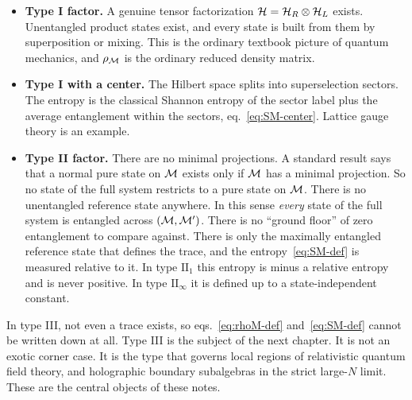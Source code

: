\begin{itemize}
\item \textbf{Type I factor.} A genuine tensor factorization $\mathcal{H}=\mathcal{H}_R\otimes\mathcal{H}_L$ exists. Unentangled
product states exist, and every state is built from them by superposition or mixing. This is the ordinary
textbook picture of quantum mechanics, and $\rho_{\mathcal{M}}$ is the ordinary reduced density matrix.
\item \textbf{Type I with a center.} The Hilbert space splits into superselection sectors. The entropy is the
classical Shannon entropy of the sector label plus the average entanglement within the sectors,
eq.~\eqref{eq:SM-center}. Lattice gauge theory is an example.
\item \textbf{Type II factor.} There are no minimal projections. A standard result says that a normal pure state
on $\mathcal{M}$ exists only if $\mathcal{M}$ has a minimal projection. So no state of the full system restricts to a pure state
on $\mathcal{M}$. There is no unentangled reference state anywhere. In this sense \emph{every} state of the full system
is entangled across $(\mathcal{M},\mathcal{M}')$. There is no ``ground floor'' of zero entanglement to compare against. There is
only the maximally entangled reference state that defines the trace, and the entropy~\eqref{eq:SM-def} is
measured relative to it. In type $\mathrm{II}_1$ this entropy is minus a relative entropy and is never positive.
In type $\mathrm{II}_\infty$ it is defined up to a state-independent constant.
\end{itemize}

In type III, not even a trace exists, so eqs.~\eqref{eq:rhoM-def} and~\eqref{eq:SM-def} cannot be written down
at all. Type III is the subject of the next chapter. It is not an exotic corner case. It is the type that governs
local regions of relativistic quantum field theory, and holographic boundary subalgebras in the strict large-$N$
limit. These are the central objects of these notes.
